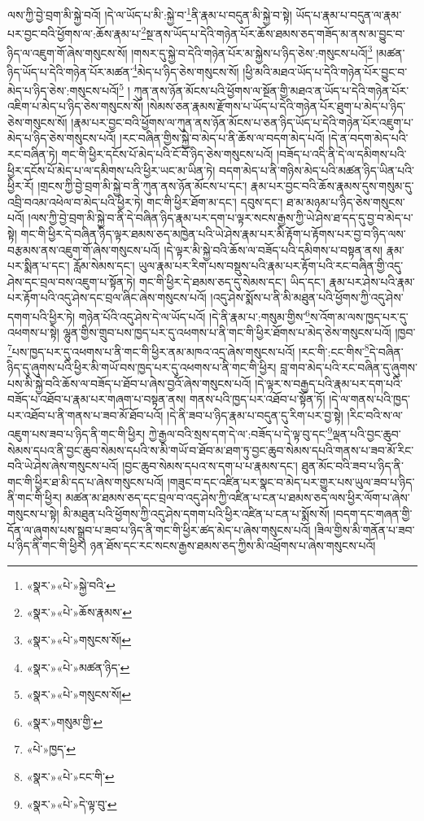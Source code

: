 ལས་ཀྱི་བྱེ་བྲག་མི་སྐྱེ་བའོ། །དེ་ལ་ཡོད་པ་མི་:སྐྱེ་བ་\footnote{«སྣར་»«པེ་»སྐྱེ་བའི་}ནི་རྣམ་པ་བདུན་མི་སྐྱེ་བ་སྟེ། ཡོད་པ་རྣམ་པ་བདུན་ལ་རྣམ་པར་བྱང་བའི་ཕྱོགས་ལ་:ཆོས་རྣམ་པ་\footnote{«སྣར་»«པེ་»ཆོས་རྣམས་}སྔ་ནས་ཡོད་པ་དེའི་གཉེན་པོར་ཆོས་ཐམས་ཅད་གཟོད་མ་ནས་མ་བྱུང་བ་ཉིད་ལ་འཇུག་གོ་ཞེས་གསུངས་སོ། །གསར་དུ་སྐྱེ་བ་དེའི་གཉེན་པོར་མ་སྐྱེས་པ་ཉིད་ཅེས་:གསུངས་པའོ།\footnote{«སྣར་»«པེ་»གསུངས་སོ།} །མཚན་ཉིད་ཡོད་པ་དེའི་གཉེན་པོར་མཚན་\footnote{«སྣར་»«པེ་»མཚན་ཉིད་}མེད་པ་ཉིད་ཅེས་གསུངས་སོ། །ཕྱི་མའི་མཐའ་ཡོད་པ་དེའི་གཉེན་པོར་བྱུང་བ་མེད་པ་ཉིད་ཅེས་:གསུངས་པའོ།\footnote{«སྣར་»«པེ་»གསུངས་སོ།} །
ཀུན་ནས་ཉོན་མོངས་པའི་ཕྱོགས་ལ་སྔོན་གྱི་མཐའ་ན་ཡོད་པ་དེའི་གཉེན་པོར་འཇིག་པ་མེད་པ་ཉིད་ཅེས་གསུངས་སོ། །སེམས་ཅན་རྣམས་རྫོགས་པ་ཡོད་པ་དེའི་གཉེན་པོར་ཐུག་པ་མེད་པ་ཉིད་ཅེས་གསུངས་སོ། །རྣམ་པར་བྱང་བའི་ཕྱོགས་ལ་ཀུན་ནས་ཉོན་མོངས་པ་ཅན་ཉིད་ཡོད་པ་དེའི་གཉེན་པོར་འཇུག་པ་མེད་པ་ཉིད་ཅེས་གསུངས་པའོ། །རང་བཞིན་གྱིས་སྐྱེ་བ་མེད་པ་ནི་ཆོས་ལ་བདག་མེད་པའོ། །དེ་ན་བདག་མེད་པའི་རང་བཞིན་ཏེ། གང་གི་ཕྱིར་དངོས་པོ་མེད་པའི་ངོ་བོ་ཉིད་ཅེས་གསུངས་པའོ། །བཟོད་པ་འདི་ནི་དེ་ལ་དམིགས་པའི་ཕྱིར་དངོས་པོ་མེད་པ་ལ་དམིགས་པའི་ཕྱིར་ཡང་མ་ཡིན་ཏེ། བདག་མེད་པ་ནི་གཉིས་མེད་པའི་མཚན་ཉིད་ཡིན་པའི་ཕྱིར་རོ། །གྲངས་ཀྱི་བྱེ་བྲག་མི་སྐྱེ་བ་ནི་ཀུན་ནས་ཉོན་མོངས་པ་དང་། རྣམ་པར་བྱང་བའི་ཆོས་རྣམས་དུས་གསུམ་དུ་འབྲི་བའམ་འཕེལ་བ་མེད་པའི་ཕྱིར་ཏེ། གང་གི་ཕྱིར་ཐོག་མ་དང་། དབུས་དང་། ཐ་མ་མཉམ་པ་ཉིད་ཅེས་གསུངས་པའོ། །ལས་ཀྱི་བྱེ་བྲག་མི་སྐྱེ་བ་ནི་དེ་བཞིན་ཉིད་རྣམ་པར་དག་པ་ལྟར་སངས་རྒྱས་ཀྱི་ཡེ་ཤེས་ཐ་དད་དུ་བྱ་བ་མེད་པ་སྟེ། གང་གི་ཕྱིར་དེ་བཞིན་ཉིད་ལྟར་ཐམས་ཅད་མཁྱེན་པའི་ཡེ་ཤེས་རྣམ་པར་མི་རྟོག་པ་རྟོགས་པར་བྱ་བ་ཉིད་ལས་བརྩམས་ནས་འཇུག་གོ་ཞེས་གསུངས་པའོ། །དེ་ལྟར་མི་སྐྱེ་བའི་ཆོས་ལ་བཟོད་པའི་དམིགས་པ་བསྟན་ནས། རྣམ་པར་སྨིན་པ་དང་། རློམ་སེམས་དང་། ཡུལ་རྣམ་པར་རིག་པས་བསྡུས་པའི་རྣམ་པར་རྟོག་པའི་རང་བཞིན་གྱི་འདུ་ཤེས་དང་བྲལ་བས་འཇུག་པ་སྟོན་ཏེ། གང་གི་ཕྱིར་དེ་ཐམས་ཅད་དུ་སེམས་དང་། ཡིད་དང་། རྣམ་པར་ཤེས་པའི་རྣམ་པར་རྟོག་པའི་འདུ་ཤེས་དང་བྲལ་ཞིང་ཞེས་གསུངས་པའོ། །འདུ་ཤེས་སྨོས་པ་ནི་མི་མཐུན་པའི་ཕྱོགས་ཀྱི་འདུ་ཤེས་དགག་པའི་ཕྱིར་ཏེ། གཉེན་པོའི་འདུ་ཤེས་དེ་ལ་ཡོད་པའོ། །དེ་ནི་རྣམ་པ་:གསུམ་གྱིས་\footnote{«སྣར་»གསུམ་གྱི་}ས་འོག་མ་ལས་ཁྱད་པར་དུ་འཕགས་པ་སྟེ། ལྷུན་གྱིས་གྲུབ་པས་ཁྱད་པར་དུ་འཕགས་པ་ནི་གང་གི་ཕྱིར་ཐོགས་པ་མེད་ཅེས་གསུངས་པའོ། །ཁྱབ་\footnote{«པེ་»ཁྱད་}པས་ཁྱད་པར་དུ་འཕགས་པ་ནི་གང་གི་ཕྱིར་ནམ་མཁའ་འདྲ་ཞེས་གསུངས་པའོ། །རང་གི་:ངང་གིས་\footnote{«སྣར་»«པེ་»ངང་གི་}དེ་བཞིན་ཉིད་དུ་ཞུགས་པའི་ཕྱིར་མི་གཡོ་བས་ཁྱད་པར་དུ་འཕགས་པ་ནི་གང་གི་ཕྱིར། བླ་གབ་མེད་པའི་རང་བཞིན་དུ་ཞུགས་པས་མི་སྐྱེ་བའི་ཆོས་ལ་བཟོད་པ་ཐོབ་པ་ཞེས་བྱའོ་ཞེས་གསུངས་པའོ། །དེ་ལྟར་ས་བརྒྱད་པའི་རྣམ་པར་དག་པའི་བཟོད་པ་འཐོབ་པ་རྣམ་པར་གཞག་པ་བསྟན་ནས། གནས་པའི་ཁྱད་པར་འཐོབ་པ་སྟོན་ཏོ། །དེ་ལ་གནས་པའི་ཁྱད་པར་འཐོབ་པ་ནི་གནས་པ་ཟབ་མོ་ཐོབ་པའོ། །དེ་ནི་ཟབ་པ་ཉིད་རྣམ་པ་བདུན་དུ་རིག་པར་བྱ་སྟེ། །རིང་བའི་ས་ལ་འཇུག་པས་ཟབ་པ་ཉིད་ནི་གང་གི་ཕྱིར། ཀྱེ་རྒྱལ་བའི་སྲས་དག་དེ་ལ་:བཟོད་པ་དེ་ལྟ་བུ་དང་\footnote{«སྣར་»«པེ་»དེ་ལྟ་བུ་}ལྡན་པའི་བྱང་ཆུབ་སེམས་དཔའ་ནི་བྱང་ཆུབ་སེམས་དཔའི་ས་མི་གཡོ་བ་ཐོབ་མ་ཐག་ཏུ་བྱང་ཆུབ་སེམས་དཔའི་གནས་པ་ཟབ་མོ་རིང་བའི་ཡེ་ཤེས་ཞེས་གསུངས་པའོ། །བྱང་ཆུབ་སེམས་དཔའ་ས་དག་པ་པ་རྣམས་དང་། ཐུན་མོང་བའི་ཟབ་པ་ཉིད་ནི་གང་གི་ཕྱིར་ཐ་མི་དད་པ་ཞེས་གསུངས་པའོ། །གཟུང་བ་དང་འཛིན་པར་སྣང་བ་མེད་པར་གྱུར་པས་ཡུལ་ཟབ་པ་ཉིད་ནི་གང་གི་ཕྱིར། མཚན་མ་ཐམས་ཅད་དང་བྲལ་བ་འདུ་ཤེས་ཀྱི་འཛིན་པ་ངན་པ་ཐམས་ཅད་ལས་ཕྱིར་ལོག་པ་ཞེས་གསུངས་པ་སྟེ། མི་མཐུན་པའི་ཕྱོགས་ཀྱི་འདུ་ཤེས་དགག་པའི་ཕྱིར་འཛིན་པ་ངན་པ་སྨོས་སོ། །བདག་དང་གཞན་གྱི་དོན་ལ་ཞུགས་པས་སྒྲུབ་པ་ཟབ་པ་ཉིད་ནི་གང་གི་ཕྱིར་ཚད་མེད་པ་ཞེས་གསུངས་པའོ། །ཟིལ་གྱིས་མི་གནོན་པ་ཟབ་པ་ཉིད་ནི་གང་གི་ཕྱིར། ཉན་ཐོས་དང་རང་སངས་རྒྱས་ཐམས་ཅད་ཀྱིས་མི་འཕྲོགས་པ་ཞེས་གསུངས་པའོ། 
